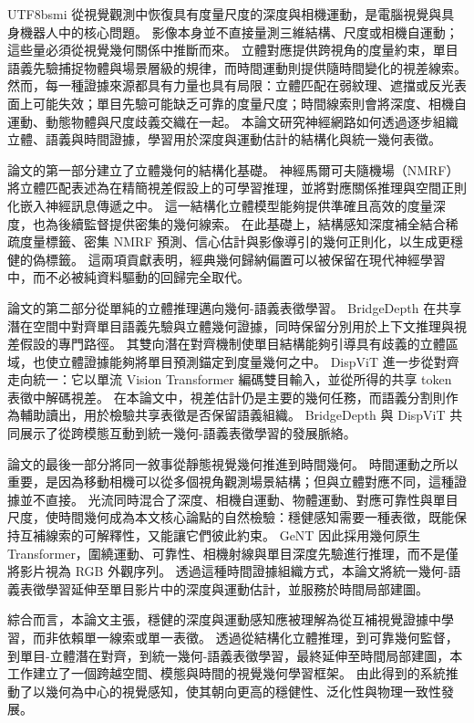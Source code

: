 \documentclass[11pt]{gsasthesis} %
\begin{document}
\begin{cabstract}
\begin{CJK}{UTF8}{bsmi}
從視覺觀測中恢復具有度量尺度的深度與相機運動，是電腦視覺與具身機器人中的核心問題。
影像本身並不直接量測三維結構、尺度或相機自運動；這些量必須從視覺幾何關係中推斷而來。
立體對應提供跨視角的度量約束，單目語義先驗捕捉物體與場景層級的規律，而時間運動則提供隨時間變化的視差線索。
然而，每一種證據來源都具有力量也具有局限：立體匹配在弱紋理、遮擋或反光表面上可能失效；單目先驗可能缺乏可靠的度量尺度；時間線索則會將深度、相機自運動、動態物體與尺度歧義交織在一起。
本論文研究神經網路如何透過逐步組織立體、語義與時間證據，學習用於深度與運動估計的結構化與統一幾何表徵。

論文的第一部分建立了立體幾何的結構化基礎。
神經馬爾可夫隨機場（NMRF）將立體匹配表述為在精簡視差假設上的可學習推理，並將對應關係推理與空間正則化嵌入神經訊息傳遞之中。
這一結構化立體模型能夠提供準確且高效的度量深度，也為後續監督提供密集的幾何線索。
在此基礎上，結構感知深度補全結合稀疏度量標籤、密集 NMRF 預測、信心估計與影像導引的幾何正則化，以生成更穩健的偽標籤。
這兩項貢獻表明，經典幾何歸納偏置可以被保留在現代神經學習中，而不必被純資料驅動的回歸完全取代。

論文的第二部分從單純的立體推理邁向幾何-語義表徵學習。
BridgeDepth 在共享潛在空間中對齊單目語義先驗與立體幾何證據，同時保留分別用於上下文推理與視差假設的專門路徑。
其雙向潛在對齊機制使單目結構能夠引導具有歧義的立體區域，也使立體證據能夠將單目預測錨定到度量幾何之中。
DispViT 進一步從對齊走向統一：它以單流 Vision Transformer 編碼雙目輸入，並從所得的共享 token 表徵中解碼視差。
在本論文中，視差估計仍是主要的幾何任務，而語義分割則作為輔助讀出，用於檢驗共享表徵是否保留語義組織。
BridgeDepth 與 DispViT 共同展示了從跨模態互動到統一幾何-語義表徵學習的發展脈絡。

論文的最後一部分將同一敘事從靜態視覺幾何推進到時間幾何。
時間運動之所以重要，是因為移動相機可以從多個視角觀測場景結構；但與立體對應不同，這種證據並不直接。
光流同時混合了深度、相機自運動、物體運動、對應可靠性與單目尺度，使時間幾何成為本文核心論點的自然檢驗：穩健感知需要一種表徵，既能保持互補線索的可解釋性，又能讓它們彼此約束。
GeNT 因此採用幾何原生 Transformer，圍繞運動、可靠性、相機射線與單目深度先驗進行推理，而不是僅將影片視為 RGB 外觀序列。
透過這種時間證據組織方式，本論文將統一幾何-語義表徵學習延伸至單目影片中的深度與運動估計，並服務於時間局部建圖。

綜合而言，本論文主張，穩健的深度與運動感知應被理解為從互補視覺證據中學習，而非依賴單一線索或單一表徵。
透過從結構化立體推理，到可靠幾何監督，到單目-立體潛在對齊，到統一幾何-語義表徵學習，最終延伸至時間局部建圖，本工作建立了一個跨越空間、模態與時間的視覺幾何學習框架。
由此得到的系統推動了以幾何為中心的視覺感知，使其朝向更高的穩健性、泛化性與物理一致性發展。
\end{CJK}

\end{cabstract}
\end{document}

